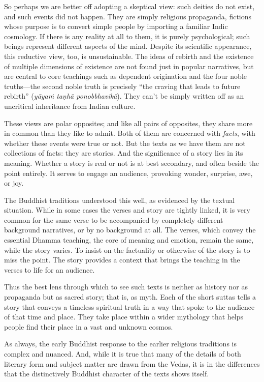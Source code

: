 \documentclass[12pt,openany]{book}%
\begin{document}
So perhaps we are better off adopting a skeptical view: such deities do not exist, and such events did not happen. They are simply religious propaganda, fictions whose purpose is to convert simple people by importing a familiar Indic cosmology. If there is any reality at all to them, it is purely psychological; such beings represent different aspects of the mind. Despite its scientific appearance, this reductive view, too, is unsustainable. The ideas of rebirth and the existence of multiple dimensions of existence are not found just in popular narratives, but are central to core teachings such as dependent origination and the four noble truths—the second noble truth is precisely “the craving that leads to future rebirth” (\textit{\textsanskrit{yāyaṁ} \textsanskrit{taṇhā} \textsanskrit{ponobbhavikā}}). They can’t be simply written off as an uncritical inheritance from Indian culture.

These views are polar opposites; and like all pairs of opposites, they share more in common than they like to admit. Both of them are concerned with \emph{facts}, with whether these events were true or not. But the texts as we have them are not collections of facts: they are stories. And the significance of a story lies in its meaning. Whether a story is real or not is at best secondary, and often beside the point entirely. It serves to engage an audience, provoking wonder, surprise, awe, or joy.

The Buddhist traditions understood this well, as evidenced by the textual situation. While in some cases the verses and story are tightly linked, it is very common for the same verse to be accompanied by completely different background narratives, or by no background at all. The verses, which convey the essential Dhamma teaching, the core of meaning and emotion, remain the same, while the story varies. To insist on the factuality or otherwise of the story is to miss the point. The story provides a context that brings the teaching in the verses to life for an audience.

Thus the best lens through which to see such texts is neither as history nor as propaganda but as sacred story; that is, as myth. Each of the short suttas tells a story that conveys a timeless spiritual truth in a way that spoke to the audience of that time and place. They take place within a wider mythology that helps people find their place in a vast and unknown cosmos.

As always, the early Buddhist response to the earlier religious traditions is complex and nuanced. And, while it is true that many of the details of both literary form and subject matter are drawn from the Vedas, it is in the differences that the distinctively Buddhist character of the texts shows itself.
\end{document}
